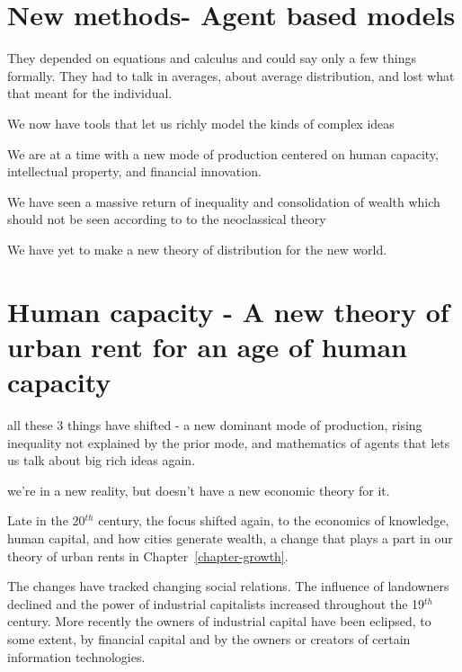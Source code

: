 



\section{New methods- Agent based models}
They depended on equations and calculus and could say only a few things formally.
They had to talk in averages, about average distribution, and lost what that meant for the individual.

We now have tools that let us richly model the kinds of complex ideas 

We are at a time with a new mode of production centered on human capacity, intellectual property, and financial innovation. %

We have seen a massive return of inequality and consolidation of wealth which should not be seen according to to the neoclassical theory %

We have yet to make a new theory of distribution for the new world.

\section{Human capacity - A new theory of urban rent for an age of human capacity}
all these 3 things have shifted - a new dominant mode of production, rising inequality not explained by the prior mode, and mathematics of agents that lets us talk about big rich ideas again.

we're in a new reality, but doesn't have a new economic theory for it. 

Late in the 20$^{th}$ century, the focus shifted again, to the economics of  knowledge, human capital, and how cities generate wealth, a change that plays a part in  our theory of urban rents in Chapter~\ref{chapter-growth}. 
 
The changes have tracked changing social relations. The influence of landowners declined and the power of industrial capitalists increased throughout the 19$^{th}$ century. More recently the owners of industrial capital have been eclipsed, to some extent, by financial capital and by the owners or creators of certain information technologies.

